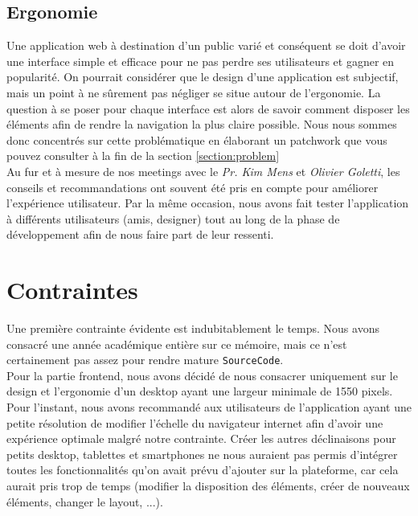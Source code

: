 \subsection*{Ergonomie}

Une application web à destination d'un public varié et conséquent se doit d'avoir une interface simple et efficace pour ne pas perdre ses utilisateurs et gagner en popularité. On pourrait considérer que le design d'une application est subjectif, mais un point à ne sûrement pas négliger se situe autour de l'ergonomie. La question à se poser pour chaque interface est alors de savoir comment disposer les éléments afin de rendre la navigation la plus claire possible. Nous nous sommes donc concentrés sur cette problématique en élaborant un patchwork que vous pouvez consulter à la fin de la section \ref{section:problem}\\

Au fur et à mesure de nos meetings avec le \textit{Pr. Kim Mens} et \textit{Olivier Goletti}, les conseils et recommandations ont souvent été pris en compte pour améliorer l'expérience utilisateur. Par la même occasion, nous avons fait tester l'application à différents utilisateurs (amis, designer) tout au long de la phase de développement afin de nous faire part de leur ressenti.

\pagebreak
\section {Contraintes}
\label{sec:ContraintesCdc}

Une première contrainte évidente est indubitablement le temps. Nous avons consacré une année académique entière sur ce mémoire, mais ce n'est certainement pas assez pour rendre mature \texttt{SourceCode}.\\

Pour la partie \gls{frontend}, nous avons décidé de nous consacrer uniquement sur le design et l'ergonomie d'un desktop ayant une largeur minimale de 1550 pixels. Pour l'instant, nous avons recommandé aux utilisateurs de l'application ayant une petite résolution de modifier l'échelle du navigateur internet afin d'avoir une expérience optimale malgré notre contrainte. Créer les autres déclinaisons pour petits desktop, tablettes et smartphones ne nous auraient pas permis d'intégrer toutes les fonctionnalités qu'on avait prévu d'ajouter sur la plateforme, car cela aurait pris trop de temps (modifier la disposition des éléments, créer de nouveaux éléments, changer le layout, ...). \\

